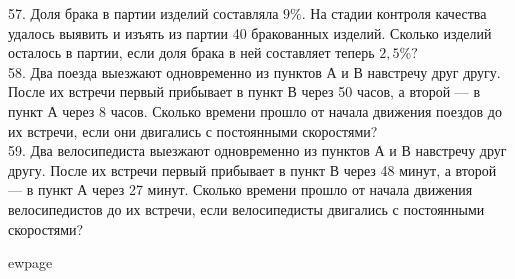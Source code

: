 57. Доля брака в партии изделий составляла $9\%.$ На стадии контроля качества удалось выявить и изъять из партии 40 бракованных изделий. Сколько изделий осталось в партии, если доля брака в ней составляет теперь $2,5\%?$\\
58. Два поезда выезжают одновременно из пунктов А и В навстречу друг другу. После их встречи первый прибывает в пункт В через 50 часов, а второй --- в пункт А через 8 часов. Сколько времени прошло от начала движения поездов до их встречи, если они двигались с постоянными скоростями?\\
59. Два велосипедиста выезжают одновременно из пунктов А и В навстречу друг другу. После их встречи первый прибывает в пункт В через 48 минут, а второй --- в пункт А через 27 минут. Сколько времени прошло от начала движения велосипедистов до их встречи, если велосипедисты двигались с постоянными скоростями?

ewpage
